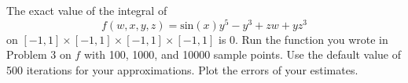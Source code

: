 \begin{problem}
\label{prob:mc_test}
The exact value of the integral of
\[
f(w,x,y,z) = \text{sin}(x) y^5 -y^3 + zw + yz^3
\]
on $[-1,1]\times[-1,1]\times[-1,1]\times[-1,1]$ is 0.
Run the function  you wrote in Problem 3 on $f$ with 100, 1000, and 10000 sample points. Use the default value of 500 iterations for your approximations.
Plot the errors of your estimates.
\end{problem}

